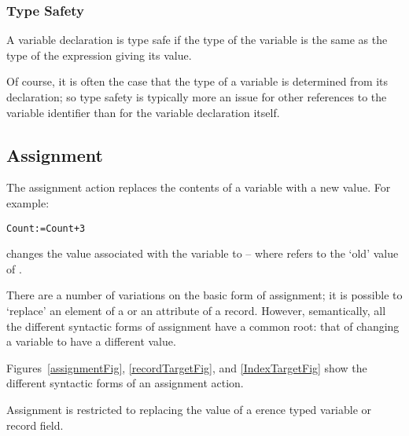 \subsubsection{Type Safety}
A variable declaration is type safe if the type of the variable is the same as the type of the expression giving its value.
\begin{aside}
Of course, it is often the case that the type of a variable is determined from its declaration; so type safety is typically more an issue for other references to the variable identifier than for the variable declaration itself.
\end{aside}

\begin{prooftree}
\end{prooftree}

\begin{prooftree}
\end{prooftree}

\subsection{Assignment}
\label{assignment}
The assignment action \q{:=} replaces the contents of a variable with a new value. For example:
\begin{alltt}
Count := Count+3
\end{alltt}
changes the value associated with the variable  to  -- where  refers to the `old' value of .

There are a number of variations on the basic form of assignment; it is possible to `replace' an element of a  or an attribute of a record. However, semantically, all the different syntactic forms of assignment have a common root: that of changing a variable to have a different value.

Figures~\vref{assignmentFig}, \vref{recordTargetFig}, and \vref{IndexTargetFig} show the different syntactic forms of an assignment action.

\begin{aside}
Assignment is restricted to replacing the value of a erence typed variable or record field.
\end{aside}

